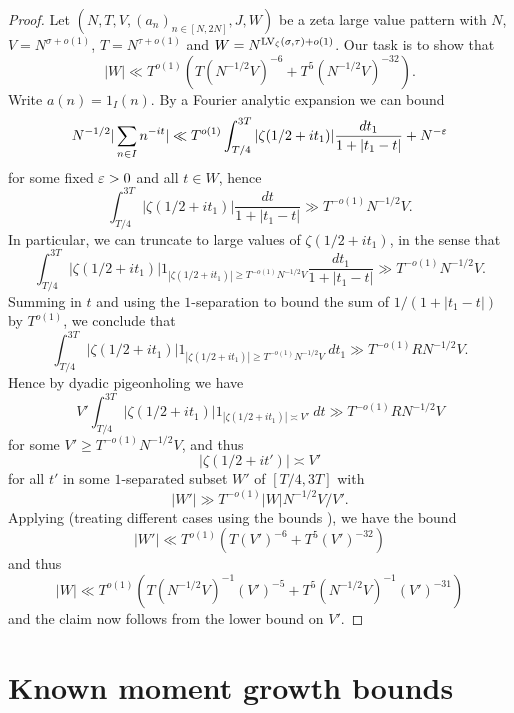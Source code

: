 \begin{proof} Let $(N,T,V,(a_n)_{n \in [N,2N]},J,W)$ be a zeta large value pattern with $N$, $V = N^{\sigma+o(1)}$, $T = N^{\tau+o(1)}$ and $W = N^{\mathrm{LV}_\zeta(\sigma,\tau)+o(1)}$.
Our task is to show that
$$ |W| \ll T^{o(1)} ( T (N^{-1/2} V)^{-6} + T^5 (N^{-1/2} V)^{-32}).$$
Write $a(n) = 1_I(n)$. By a Fourier analytic expansion we can bound
$$ N^{-1/2} |\sum_{n \in I} n^{-it}| \ll T^{o(1)} \int_{T/4}^{3T} |\zeta(1/2+it_1)| \frac{dt_1}{1+|t_1-t|} + N^{-\varepsilon}$$
for some fixed $\varepsilon>0$ and all $t \in W$, hence
$$ \int_{T/4}^{3T} |\zeta(1/2+it_1)| \frac{dt}{1+|t_1-t|} \gg T^{-o(1)} N^{-1/2} V.$$
In particular, we can truncate to large values of $\zeta(1/2+it_1)$, in the sense that
$$ \int_{T/4}^{3T} |\zeta(1/2+it_1)| 1_{|\zeta(1/2+it_1)| \geq T^{-o(1)} N^{-1/2} V} \frac{dt_1}{1+|t_1-t|} \gg T^{-o(1)} N^{-1/2} V.$$
Summing in $t$ and using the $1$-separation to bound the sum of $1/(1+|t_1-t|)$ by $T^{o(1)}$, we conclude that
$$ \int_{T/4}^{3T} |\zeta(1/2+it_1)| 1_{|\zeta(1/2+it_1)| \geq T^{-o(1)} N^{-1/2} V} \ dt_1 \gg T^{-o(1)} R N^{-1/2} V.$$
Hence by dyadic pigeonholing we have
$$ V' \int_{T/4}^{3T} |\zeta(1/2+it_1)| 1_{|\zeta(1/2+it_1)| \asymp V'} \ dt \gg T^{-o(1)} R N^{-1/2} V$$
for some $V' \geq T^{-o(1)} N^{-1/2} V$, and thus
$$ |\zeta(1/2+it')| \asymp V'$$
for all $t'$ in some $1$-separated subset $W'$ of $[T/4, 3T]$ with
$$ |W'| \gg T^{-o(1)} |W| N^{-1/2} V / V'.$$
Applying \cite[Theorem 2]{heathbrown_twelfth_1978} (treating different cases using the bounds \cite[(7), (8), (9)]{heathbrown_twelfth_1978}), we have the bound
$$ |W'| \ll T^{o(1)} ( T (V')^{-6} + T^5 (V')^{-32})$$
and thus
$$ |W| \ll T^{o(1)} ( T (N^{-1/2} V)^{-1} (V')^{-5} + T^5 (N^{-1/2} V)^{-1} (V')^{-31})$$
and the claim now follows from the lower bound on $V'$.
\end{proof}

\section{Known moment growth bounds}

